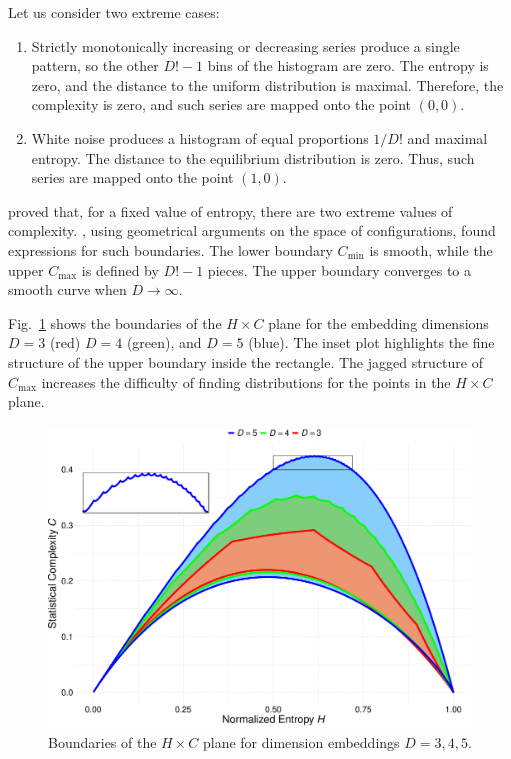 \documentclass[alpha-refs]{wiley-article}
\begin{document}
Let us consider two extreme cases:
\begin{enumerate}[label=Case~\Roman*., align=left, leftmargin=*]
\item 	Strictly monotonically increasing or decreasing series produce a single pattern, so the other $D!-1$ bins of the histogram are zero. 
The entropy is zero, and the distance to the uniform distribution is maximal. 
Therefore, the complexity is zero, and such series are mapped onto the point $(0,0)$.
\item 	White noise produces a histogram of equal proportions $1/D!$ and maximal entropy. 
The distance to the equilibrium distribution is zero. 
Thus, such series are mapped onto the point $(1,0)$.
\end{enumerate}

\citet{SomeFeaturesoftheLMCStatisticalComplexity} proved that, for a fixed value of entropy, there are two extreme values of complexity.
\citet{martin2006generalized}, using geometrical arguments on the space of configurations, found expressions for such boundaries.
The lower boundary $C_{\min}$ is smooth, while the upper $C_{\max}$ is defined by $D!-1$ pieces.
The upper boundary converges to a smooth curve when $D\to\infty$.


Fig.~\ref{fig:Boundaries} shows the boundaries of the $H\times C$ plane for the embedding dimensions $D=3$ (red) $D=4$ (green), and $D=5$ (blue).
The inset plot highlights the fine structure of the upper boundary inside the rectangle.
The jagged structure of $C_{\max}$ increases the difficulty of finding distributions for the points in the $H\times C$ plane.

\begin{figure}[hbt]
\centering
\includegraphics[width=.7\linewidth]{Figures/BoundariesPlot}
\caption{Boundaries of the $H\times C$ plane for dimension embeddings $D=3,4,5$.}\label{fig:Boundaries}
\end{figure}
\end{document}
